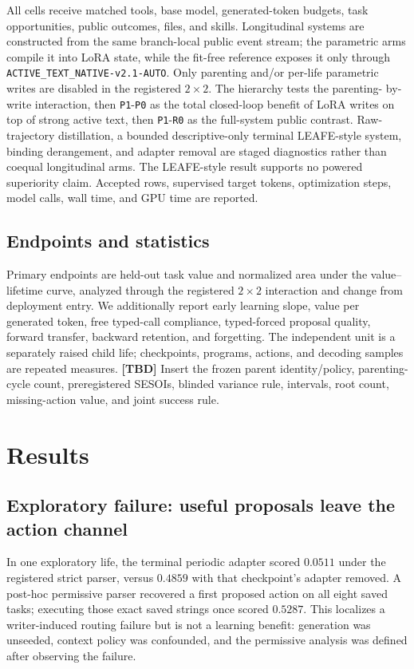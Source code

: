 \documentclass{article}
\newcommand{\tbd}{\textbf{[TBD]}}
\begin{document}
All cells receive matched tools, base model, generated-token budgets, task
opportunities, public outcomes, files, and skills. Longitudinal systems are
constructed from the same branch-local public event stream; the parametric
arms compile it into LoRA state, while the fit-free reference exposes it only
through \texttt{ACTIVE\_TEXT\_NATIVE-v2.1-AUTO}. Only parenting and/or per-life
parametric writes are disabled in the registered $2\times2$. The hierarchy tests the parenting-
by-write interaction, then \texttt{P1}-\texttt{P0} as the total closed-loop
benefit of LoRA writes on top of strong active text, then
\texttt{P1}-\texttt{R0} as the full-system public contrast. Raw-trajectory
distillation, a bounded descriptive-only terminal LEAFE-style system, binding
derangement, and adapter removal are staged diagnostics rather than coequal
longitudinal arms. The LEAFE-style result supports no powered superiority
claim.
Accepted rows, supervised target tokens, optimization steps, model calls,
wall time, and GPU time are reported.

\subsection{Endpoints and statistics}

Primary endpoints are held-out task value and normalized area under the
value--lifetime curve, analyzed through the registered $2\times2$ interaction
and change from deployment entry. We additionally report early learning
slope, value per generated token, free typed-call compliance, typed-forced
proposal quality, forward transfer, backward retention, and forgetting. The
independent unit is a separately raised child life; checkpoints, programs,
actions, and decoding samples are repeated measures. \tbd{} Insert the frozen
parent identity/policy, parenting-cycle count, preregistered SESOIs, blinded
variance rule, intervals, root count, missing-action value, and joint success
rule.

\section{Results}

\subsection{Exploratory failure: useful proposals leave the action channel}

In one exploratory life, the terminal periodic adapter scored $0.0511$ under
the registered strict parser, versus $0.4859$ with that checkpoint's adapter
removed. A post-hoc permissive parser recovered a first proposed action on all
eight saved tasks; executing those exact saved strings once scored $0.5287$.
This localizes a writer-induced routing failure but is not a learning benefit:
generation was unseeded, context policy was confounded, and the permissive
analysis was defined after observing the failure.
\end{document}
